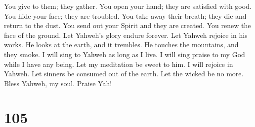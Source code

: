  You give to them; they gather. You open your hand; they
are satisfied with good.  You hide your face; they are
troubled. You take away their breath; they die and return to the dust.
 You send out your Spirit and they are created. You renew
the face of the ground.  Let Yahweh's glory endure forever.
Let Yahweh rejoice in his works.  He looks at the earth,
and it trembles. He touches the mountains, and they smoke. 
I will sing to Yahweh as long as I live. I will sing praise to my God
while I have any being.  Let my meditation be sweet to him.
I will rejoice in Yahweh.  Let sinners be consumed out of
the earth. Let the wicked be no more. Bless Yahweh, my soul. Praise Yah!

\hypertarget{section-95}{%
\section{105}\label{section-95}}

